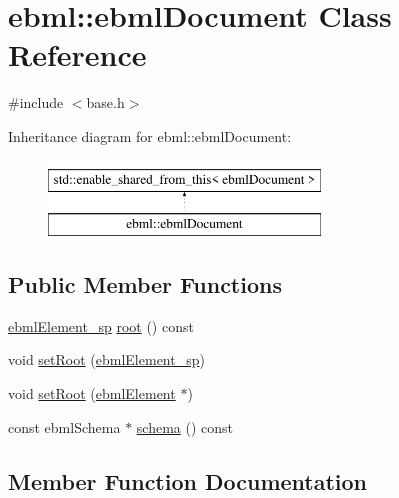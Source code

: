 \hypertarget{classebml_1_1ebmlDocument}{}\section{ebml\+:\+:ebml\+Document Class Reference}
\label{classebml_1_1ebmlDocument}


{\ttfamily \#include $<$base.\+h$>$}

Inheritance diagram for ebml\+:\+:ebml\+Document\+:\begin{figure}[H]
\begin{center}
\leavevmode
\includegraphics[height=2.000000cm]{classebml_1_1ebmlDocument}
\end{center}
\end{figure}
\subsection*{Public Member Functions}
\begin{DoxyCompactItemize}
\item 
\mbox{\hyperlink{namespaceebml_adad533b7705a16bb360fe56380c5e7be}{ebml\+Element\+\_\+sp}} \mbox{\hyperlink{classebml_1_1ebmlDocument_a49d24c6b8375b0707787a2d62aabfa0a}{root}} () const
\item 
void \mbox{\hyperlink{classebml_1_1ebmlDocument_a387ed69ab3730a9e0f30ac4cd8ab0a8e}{set\+Root}} (\mbox{\hyperlink{namespaceebml_adad533b7705a16bb360fe56380c5e7be}{ebml\+Element\+\_\+sp}})
\item 
void \mbox{\hyperlink{classebml_1_1ebmlDocument_a4c63a8355ff1227d80c6cfc511ec1bb6}{set\+Root}} (\mbox{\hyperlink{classebml_1_1ebmlElement}{ebml\+Element}} $\ast$)
\item 
const ebml\+Schema $\ast$ \mbox{\hyperlink{classebml_1_1ebmlDocument_aff3d1abece0a2bedf5a90e6af0ff3ddd}{schema}} () const
\end{DoxyCompactItemize}


\subsection{Member Function Documentation}
\mbox{\label{classebml_1_1ebmlDocument_a49d24c6b8375b0707787a2d62aabfa0a}} 
